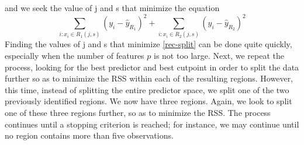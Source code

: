 and we seek the value of j and s that minimize the equation
\begin{equation}
    \sum_{i:x_i \in R_1(j, s)}(y_i - \hat{y}_{R_1})^2 + \sum_{i:x_i \in R_2(j, s)}(y_i - \hat{y}_{R_2})^2
    \label{rec-split}
\end{equation}
Finding the values of j and s that minimize \ref{rec-split} can be done quite quickly, especially when the number of features $p$ is not too large. Next, we repeat the process, looking for the best predictor and best cutpoint in order to split the data further so as to minimize the RSS within each of the resulting regions. However, this time, instead of splitting the entire predictor space, we split one of the two previously identified regions. We now have three regions. Again, we look to split one of these three regions further, so as to minimize the RSS. The process continues until a stopping criterion is reached; for instance, we may continue until no region contains more than five observations.

